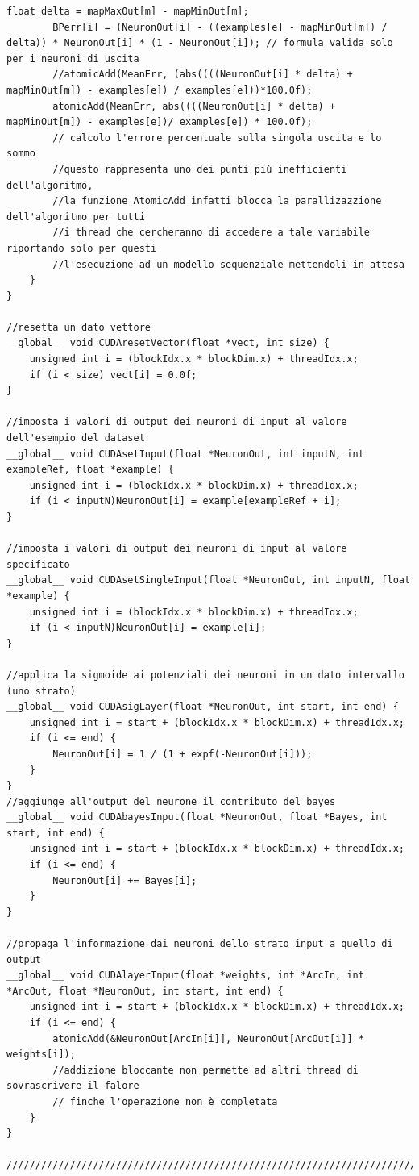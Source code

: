 \documentclass[10pt,a4paper]{article}
\begin{document}
\begin{lstlisting}[style=mycuda, caption=cuda kernels, captionpos=b]
		float delta = mapMaxOut[m] - mapMinOut[m];
		BPerr[i] = (NeuronOut[i] - ((examples[e] - mapMinOut[m]) / delta)) * NeuronOut[i] * (1 - NeuronOut[i]); // formula valida solo per i neuroni di uscita
		//atomicAdd(MeanErr, (abs((((NeuronOut[i] * delta) + mapMinOut[m]) - examples[e]) / examples[e]))*100.0f);
		atomicAdd(MeanErr, abs((((NeuronOut[i] * delta) + mapMinOut[m]) - examples[e])/ examples[e]) * 100.0f);
		// calcolo l'errore percentuale sulla singola uscita e lo sommo 
		//questo rappresenta uno dei punti più inefficienti dell'algoritmo, 
		//la funzione AtomicAdd infatti blocca la parallizazzione dell'algoritmo per tutti
		//i thread che cercheranno di accedere a tale variabile riportando solo per questi
		//l'esecuzione ad un modello sequenziale mettendoli in attesa
	}
}

//resetta un dato vettore 
__global__ void CUDAresetVector(float *vect, int size) {
	unsigned int i = (blockIdx.x * blockDim.x) + threadIdx.x;
	if (i < size) vect[i] = 0.0f;
}

//imposta i valori di output dei neuroni di input al valore dell'esempio del dataset
__global__ void CUDAsetInput(float *NeuronOut, int inputN, int exampleRef, float *example) {
	unsigned int i = (blockIdx.x * blockDim.x) + threadIdx.x;
	if (i < inputN)NeuronOut[i] = example[exampleRef + i];
}

//imposta i valori di output dei neuroni di input al valore specificato
__global__ void CUDAsetSingleInput(float *NeuronOut, int inputN, float *example) {
	unsigned int i = (blockIdx.x * blockDim.x) + threadIdx.x;
	if (i < inputN)NeuronOut[i] = example[i];
}

//applica la sigmoide ai potenziali dei neuroni in un dato intervallo (uno strato)
__global__ void CUDAsigLayer(float *NeuronOut, int start, int end) {
	unsigned int i = start + (blockIdx.x * blockDim.x) + threadIdx.x;
	if (i <= end) {
		NeuronOut[i] = 1 / (1 + expf(-NeuronOut[i]));
	}
}
//aggiunge all'output del neurone il contributo del bayes
__global__ void CUDAbayesInput(float *NeuronOut, float *Bayes, int start, int end) {
	unsigned int i = start + (blockIdx.x * blockDim.x) + threadIdx.x;
	if (i <= end) {
		NeuronOut[i] += Bayes[i];
	}
}

//propaga l'informazione dai neuroni dello strato input a quello di output
__global__ void CUDAlayerInput(float *weights, int *ArcIn, int *ArcOut, float *NeuronOut, int start, int end) {
	unsigned int i = start + (blockIdx.x * blockDim.x) + threadIdx.x;
	if (i <= end) {
		atomicAdd(&NeuronOut[ArcIn[i]], NeuronOut[ArcOut[i]] * weights[i]); 
		//addizione bloccante non permette ad altri thread di sovrascrivere il falore
		// finche l'operazione non è completata
	}
}

//////////////////////////////////////////////////////////////////////////////////////
\end{lstlisting}
\end{document}
